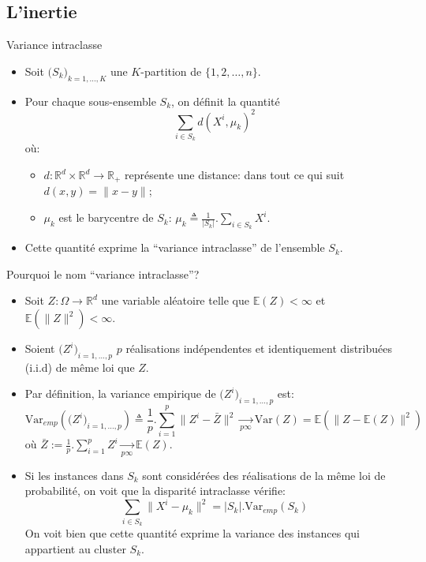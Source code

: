 \documentclass[8pt]{beamer}
\begin{document}
		\subsection{L'inertie}
			\begin{frame}{Variance intraclasse}
				\begin{itemize}
					\item<1-> Soit \(\big(S_k\big)_{k = 1, \dots, K}\) une \(K\)-partition de \(\{1, 2, \dots, n\}\).
					\item<2-> Pour chaque sous-ensemble \(S_k\), on définit la quantité
						\begin{equation}
							\sum_{i\in S_k} d(X^i, \mu_k)^2
						\end{equation}
					 où:
						\begin{itemize}
							\item<3-> \(d: \mathbb{R}^d \times \mathbb{R}^d \rightarrow \mathbb{R}_+\) représente une distance: dans tout ce qui suit \(d(x, y) = \lVert x - y \rVert\);
							\item<3-> \(\mu_k\) est le barycentre de \(S_k\): \( \mu_k \triangleq \frac{1}{\vert S_k \vert}.\sum_{i\in S_k} X^i\).
						\end{itemize}
					\item<4-> Cette quantité exprime la ``variance intraclasse'' de l'ensemble \(S_k\).
				\end{itemize}
			\end{frame}
			\begin{frame}{Pourquoi le nom ``variance intraclasse''?}
				\begin{itemize}
					\item<1-> Soit \(Z: \Omega \rightarrow \mathbb{R}^d\) une variable aléatoire telle que \(\mathbb{E}(Z) < \infty\) et \(\mathbb{E}(\lVert Z \rVert^2) < \infty\).
					\item<2-> Soient \(\big(Z^i\big)_{i=1,\dots,p}\) \(p\) réalisations indépendentes et identiquement distribuées (i.i.d) de même loi que \(Z\).
					\item<3-> Par définition, la variance empirique de \(\big(Z^i\big)_{i=1,\dots,p}\) est:
						\begin{equation}
							\text{Var}_{emp}(\big(Z^i\big)_{i=1,\dots,p}) \triangleq \frac{1}{p} . \sum_{i=1}^{p} \lVert Z^i - \bar Z \rVert^2 \underset{p\infty}{\longrightarrow} \text{Var}(Z) = \mathbb{E}(\lVert Z - \mathbb{E}(Z) \rVert^2)
						\end{equation}
						où \(\bar Z := \frac{1}{p}.\sum_{i=1}^{p} Z^i \underset{p\infty}{\longrightarrow} \mathbb{E}(Z)\).
					\item<4-> Si les instances dans \(S_k\) sont considérées des réalisations de la même loi de probabilité, on voit que la disparité intraclasse vérifie:
						\begin{equation}
							\sum_{i\in S_k} \lVert X^i - \mu_k \rVert^2 = \vert S_k \vert . \text{Var}_{emp}(S_k)
						\end{equation}
						On voit bien que cette quantité exprime la variance des instances qui appartient au cluster \(S_k\).
				\end{itemize}
			\end{frame}
\end{document}
